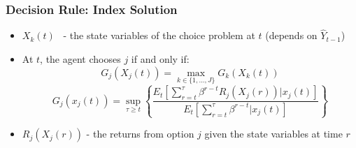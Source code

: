 
\begin{frame}[label=GITTINS]

\frametitle{Decision Rule: Index Solution}

\begin{itemize}
\item $X_{k}(t)$ \ - the state variables of the choice problem at $t$
(depends on $\widehat{Y}_{t-1}$)

\item At $t$, the agent chooses $j$ if and only if:%
\[
G_{j}(X_{j}(t))=\max_{k\in \{1,...,J\}}G_{k}(X_{k}(t)) 
\]%
\[
G_{j}(x_{j}(t))=\sup_{\tau \geq t}\left\{ \frac{E_{t}\left[ \sum_{r=t}^{\tau
}\beta ^{r-t}R_{j}(X_{j}(r))|x_{j}(t)\right] }{E_{t}\left[ \sum_{r=t}^{\tau
}\beta ^{r-t}|x_{j}(t)\right] }\right\} 
\]

\item $R_{j}(X_{j}(r))$ - the returns from option $j$ given the state
variables at time $r$
\end{itemize}

\hyperlink{DYNAM}{}
\end{frame}

















































